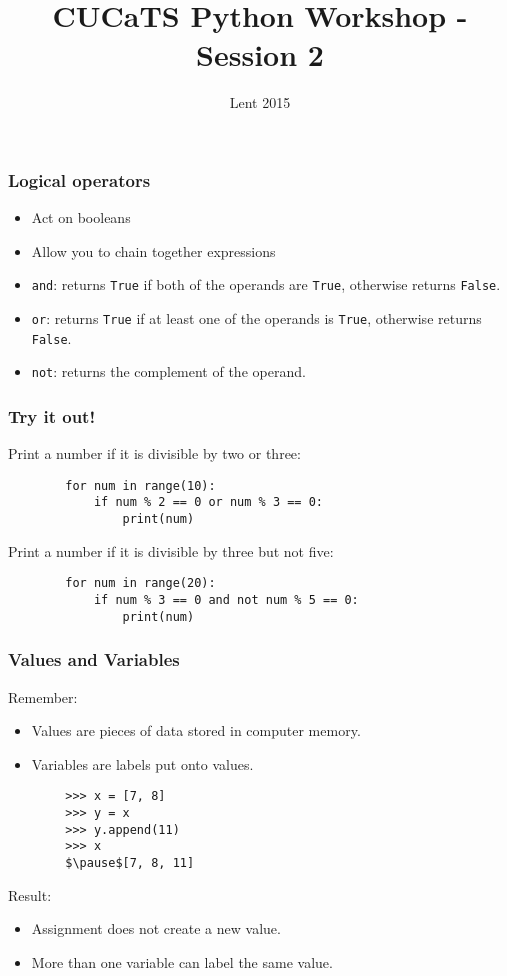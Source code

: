 \documentclass[notes]{beamer}
\title{CUCaTS Python Workshop - Session 2}
\date{Lent 2015}
\begin{document}
	\begin{frame}[fragile]
		\maketitle
	\end{frame}
	
	
	\begin{frame}[fragile]
		\frametitle{Logical operators}
		\begin{itemize}
			\item Act on booleans
			\item Allow you to chain together expressions
			\pause
			\item \lstinline|and|: returns \lstinline|True| if both of the operands are \lstinline|True|, otherwise returns \lstinline|False|.
			\item \lstinline|or|: returns \lstinline|True| if at least one of the operands is \lstinline|True|, otherwise returns \lstinline|False|.
			\item \lstinline|not|: returns the complement of the operand.
		\end{itemize}
	\end{frame}

	\begin{frame}[fragile]
		\frametitle{Try it out!}

		Print a number if it is divisible by two or three:

		\begin{lstlisting}
		for num in range(10):
		    if num % 2 == 0 or num % 3 == 0:
		        print(num)
		\end{lstlisting}

		Print a number if it is divisible by three but not five:

		\begin{lstlisting}
		for num in range(20):
		    if num % 3 == 0 and not num % 5 == 0:
		        print(num)
		\end{lstlisting}
	\end{frame}
	
	\begin{frame}[fragile]
		\frametitle{Values and Variables}
		Remember:
		\begin{itemize}
			\item Values are pieces of data stored in computer memory.
			\item Variables are labels put onto values.
		\end{itemize}
		
		\pause
		
		\begin{lstlisting}
		>>> x = [7, 8]
		>>> y = x
		>>> y.append(11)
		>>> x
		$\pause$[7, 8, 11]
		\end{lstlisting}
		
		Result:
		\begin{itemize}
			\item Assignment does not create a new value.
			\item More than one variable can label the same value.
		\end{itemize}
	\end{frame}
	
\end{document}
